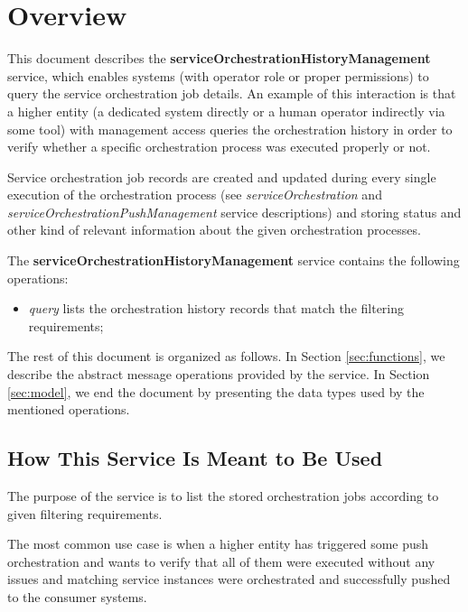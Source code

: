 \documentclass[a4paper]{arrowhead}
\begin{document}
\tableofcontents
\newpage

\section{Overview}
\label{sec:overview}
This document describes the \textbf{serviceOrchestrationHistoryManagement} service, which enables systems (with operator role or proper permissions) to query the service orchestration job details. An example of this interaction is that a higher entity (a dedicated system directly or a human operator indirectly via some tool) with management access queries the orchestration history in order to verify whether a specific orchestration process was executed properly or not. 

Service orchestration job records are created and updated during every single execution of the orchestration process (see \textit{serviceOrchestration} and \textit{serviceOrchestrationPushManagement} service descriptions) and storing status and other kind of relevant information about the given orchestration processes.

The \textbf{serviceOrchestrationHistoryManagement} service contains the following operations:

\begin{itemize}
    \item \textit{query} lists the orchestration history records that match the filtering requirements;
\end{itemize}

The rest of this document is organized as follows.
In Section \ref{sec:functions}, we describe the abstract message operations provided by the service.
In Section \ref{sec:model}, we end the document by presenting the data types used by the mentioned operations.

\subsection{How This Service Is Meant to Be Used}

The purpose of the service is to list the stored orchestration jobs according to given filtering requirements.

The most common use case is when a higher entity has triggered some push orchestration and wants to verify that all of them were executed without any issues and matching service instances were orchestrated and successfully pushed to the consumer systems.
\end{document}
